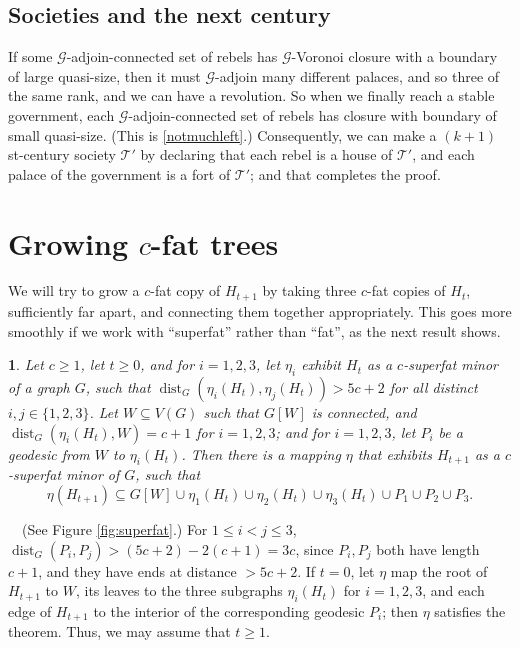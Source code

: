 \documentclass[titlepage,11pt]{article}
\newcommand{\dist}{\operatorname{dist}}
\newcommand{\mac}{\mathcal}
\newtheorem{thm}{}[section]
\newcommand{\Proof}{\noindent{\bf Proof.}\ \ }
\begin{document}
	\subsection{Societies and the next century}
	
	If some $\mac G$-adjoin-connected set of rebels has $\mac G$-Voronoi closure with a boundary of large quasi-size, then it must 
	$\mac G$-adjoin many different palaces, and so three of the same rank,  and we
	can have a revolution. So when we finally reach a stable government, each $\mac G$-adjoin-connected set of rebels has closure with boundary of 
	small quasi-size. (This is \ref{notmuchleft}.)
	Consequently, we can make a $(k+1)$st-century society $\mac T'$ by declaring that each rebel is a house of $\mac T'$, and each 
	palace of the government is a fort of $\mac T'$; and that completes the proof.
	
	
	
	\section{Growing $c$-fat trees}
	
	We will try to grow a $c$-fat copy of $H_{t+1}$ by taking three $c$-fat copies of
	$H_{t}$, sufficiently far apart, and connecting them together appropriately. This goes more smoothly if we work with ``superfat'' rather than ``fat'', as the next result shows.
	
	\begin{thm}\label{claw}
		Let $c\ge 1$, let $t\ge 0$, and for $i = 1,2,3$, let $\eta_i$ exhibit $H_t$ as a $c$-superfat minor of a graph $G$,
		such that $\dist_G(\eta_i(H_t), \eta_j(H_t))> 5c+2$ for all distinct $i,j\in \{1,2,3\}$.
		Let $W\subseteq V(G)$ such that
		$G[W]$ is connected, and
		$\dist_G(\eta_i(H_t),W)= c+1$ for $i = 1,2,3$; and for $i = 1,2,3$, let $P_i$ be a geodesic from $W$ to $\eta_i(H_t)$.
		Then there is a mapping $\eta$ that exhibits $H_{t+1}$ as a $c$-superfat minor of $G$,
		such that
		$$\eta(H_{t+1})\subseteq G[W]\cup \eta_1(H_t)\cup \eta_2(H_t)\cup \eta_3(H_t)\cup P_1\cup P_2\cup P_3.$$
	\end{thm}
	\Proof (See Figure \ref{fig:superfat}.) For $1\le i<j\le 3$, $\dist_G(P_i,P_j)> (5c+2) -2(c+1)= 3c$, since $P_i,P_j$ both have length $c+1$, and they have ends at
	distance
	$>5c+2$. If $t=0$, let $\eta$ map the root of $H_{t+1}$ to $W$, its leaves to the three subgraphs $\eta_i(H_t)$ for
	$i = 1,2,3$, and each edge of $H_{t+1}$ to the interior of the corresponding geodesic $P_i$; then $\eta$ satisfies the
	theorem. Thus, we may assume that $t\ge 1$.
	
\end{document}
